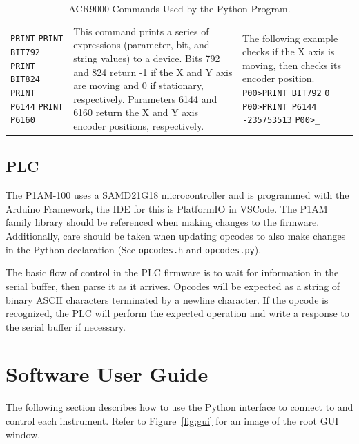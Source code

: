 \documentclass[titlepage]{article}
\begin{document}
\begin{table}[ht]
\begin{center}
\begin{tabularx}{\linewidth}{p{2cm}|>{\raggedright\arraybackslash}X|>{\raggedright\arraybackslash}X}
      \lstinline|PRINT| \newline
      \lstinline|PRINT BIT792| \newline
      \lstinline|PRINT BIT824| \newline
      \lstinline|PRINT P6144| \newline
      \lstinline|PRINT P6160|
      &
      This command prints a series of expressions (parameter, bit, and string values) to a device. Bits 792 and 824 return -1 if the X and Y axis are moving and 0 if stationary, respectively. Parameters 6144 and 6160 return the X and Y axis encoder positions, respectively. &
      The following example checks if the X axis is moving, then checks its encoder position. \newline
      \lstinline|P00>PRINT BIT792| \newline
      \lstinline|0| \newline
      \lstinline|P00>PRINT P6144| \newline
      \lstinline|-235753513| \newline
      \lstinline|P00>_|
    \end{tabularx}
  \end{center}
  \caption{ACR9000 Commands Used by the Python Program.}\label{tab:acrcommands}
\end{table}


\subsection{PLC}\label{sec:commsplc}
The P1AM-100 uses a SAMD21G18 microcontroller and is programmed with the Arduino Framework, the IDE for this is PlatformIO in VSCode. The P1AM family library should be referenced when making changes to the firmware. Additionally, care should be taken when updating opcodes to also make changes in the Python declaration (See \verb|opcodes.h| and \verb|opcodes.py|).

The basic flow of control in the PLC firmware is to wait for information in the serial buffer, then parse it as it arrives. Opcodes will be expected as a string of binary ASCII characters terminated by a newline character. If the opcode is recognized, the PLC will perform the expected operation and write a response to the serial buffer if necessary.

\section{Software User Guide}
The following section describes how to use the Python interface to connect to and control each instrument. Refer to Figure~\ref{fig:gui} for an image of the root GUI window.
\end{document}
